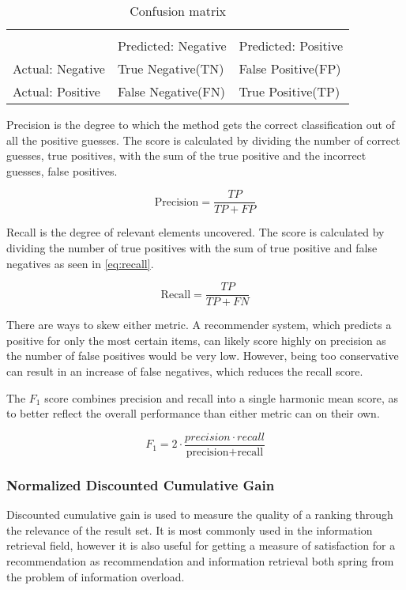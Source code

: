 \begin{table}[H]\label{tab:testandevaluation_confusionmatrix}
	\centering
	\begin{tabular}{ l|ll }
		\multicolumn{3}{l}{} \\
		& Predicted: Negative & Predicted: Positive \\ \hline
		Actual: Negative & True Negative(TN) & False Positive(FP) \\
		Actual: Positive & False Negative(FN) & True Positive(TP) \\ \hline
	\end{tabular}
	\caption{Confusion matrix}
\end{table}

Precision is the degree to which the method gets the correct classification out of all the positive guesses. The score is calculated by dividing the number of correct guesses, true positives, with the sum of the true positive and the incorrect guesses, false positives.

\begin{equation}\label{eq:precision}
	\text{Precision} = \frac{TP}{TP+FP}
\end{equation}

Recall is the degree of relevant elements uncovered. The score is calculated by dividing the number of true positives with the sum of true positive and false negatives as seen in \ref{eq:recall}.

\begin{equation}\label{eq:recall}
\text{Recall} = \frac{TP}{TP+FN}
\end{equation}

There are ways to skew either metric. A recommender system, which predicts a positive for only the most certain items, can likely score highly on precision as the number of false positives would be very low. However, being too conservative can result in an increase of false negatives, which reduces the recall score.

The $F_1$ score combines precision and recall into a single harmonic mean score, as to better reflect the overall performance than either metric can on their own.

\begin{equation}
	F_1 = 2 \cdot \frac{precision \cdot recall}{\text{precision} + \text{recall}}
\end{equation}

\subsubsection{Normalized Discounted Cumulative Gain}
Discounted cumulative gain is used to measure the quality of a ranking through the relevance of the result set. It is most commonly used in the information retrieval field, however it is also useful for getting a measure of satisfaction for a recommendation as recommendation and information retrieval both spring from the problem of information overload.

